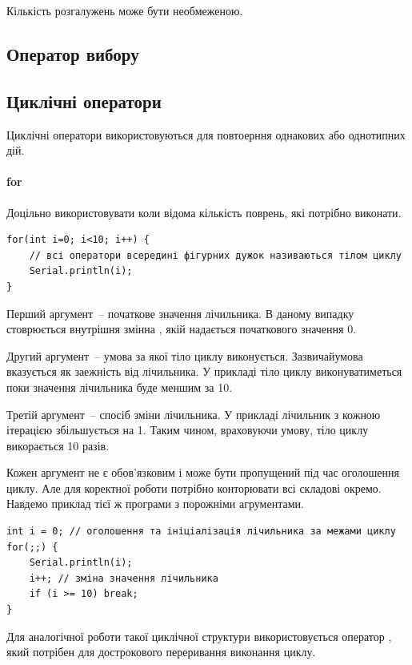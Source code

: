 \documentclass[12pt,a4paper]{book}  %
\begin{document}
Кількість розгалужень може бути необмеженою.

\subsection{Оператор вибору}


\subsection{Циклічні оператори}
Циклічні оператори використовуються для повтоерння однакових або однотипних дій.

\paragraph{for}

Доцільно використовувати коли відома кількість поврень, які потрібно виконати.

\begin{lstlisting}[label=conditionoperator,caption=Оператор повторення for]
for(int i=0; i<10; i++) {
	// всі оператори всередині фігурних дужок називаються тілом циклу
	Serial.println(i);
}
\end{lstlisting}

Перший аргумент~-- початкове значення лічильника. В даному випадку стоврюється внутрішня змінна , якій надається початкового значення 0.

Другий аргумент~-- умова за якої тіло циклу виконується. Зазвичайумова вказується як заежність від лічильника. У прикладі тіло циклу виконуватиметься поки значення лічильника буде меншим за 10.

Третій аргумент~-- спосіб зміни лічильника. У прикладі лічильник з кожною ітерацією збільшується на 1. Таким чином, враховуючи умову, тіло циклу викорається 10 разів.

Кожен аргумент не є обов'язковим і може бути пропущений під час оголошення циклу. Але для коректної роботи потрібно конторювати всі складові окремо. Навдемо приклад тієї ж програми з порожніми агрументами.

\begin{lstlisting}[label=conditionoperator,caption=Оператор повторення for]
int i = 0; // оголошення та ініціалізація лічильника за межами циклу
for(;;) {
	Serial.println(i);
	i++; // зміна значення лічильника
	if (i >= 10) break;
}
\end{lstlisting}

Для аналогічної роботи такої циклічної структури використовується оператор , який потрібен для дострокового переривання виконання циклу.
\end{document}
